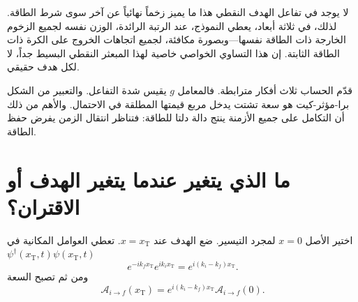 \begin{classroomqa}
\end{classroomqa}


لا يوجد في تفاعل الهدف النقطي هذا ما يميز زخماً نهائياً عن آخر سوى شرط الطاقة. لذلك، في ثلاثة أبعاد، يعطي النموذج، عند الرتبة الرائدة، الوزن نفسه لجميع الزخوم الخارجة ذات الطاقة نفسها---وبصورة مكافئة، لجميع اتجاهات الخروج على الكرة ذات الطاقة الثابتة. إن هذا التساوي الخواصي خاصية لهذا المبعثر النقطي البسيط جداً، لا لكل هدف حقيقي.

قدّم الحساب ثلاث أفكار مترابطة. فالمعامل \(g\) يقيس شدة التفاعل. والتعبير من الشكل برا-مؤثر-كيت هو سعة تشتت يدخل مربع قيمتها المطلقة في الاحتمال. والأهم من ذلك أن التكامل على جميع الأزمنة ينتج دالة دلتا للطاقة: فتناظر انتقال الزمن يفرض حفظ الطاقة.

\section{ما الذي يتغير عندما يتغير الهدف أو الاقتران؟}

اختير الأصل \(x=0\) لمجرد التيسير. ضع الهدف عند \(x=x_{\mathrm T}\). تعطي العوامل المكانية في \(\psi^\dagger(x_{\mathrm T},t)\psi(x_{\mathrm T},t)\)
\begin{equation}
e^{-ik_f x_{\mathrm T}}e^{ik_i x_{\mathrm T}}
=e^{i(k_i-k_f)x_{\mathrm T}}.
\end{equation}
ومن ثم تصبح السعة
\begin{equation}
\mathcal A_{i\to f}(x_{\mathrm T})
=e^{i(k_i-k_f)x_{\mathrm T}}
\mathcal A_{i\to f}(0).
\end{equation}

\begin{classroomqa}
\end{classroomqa}


